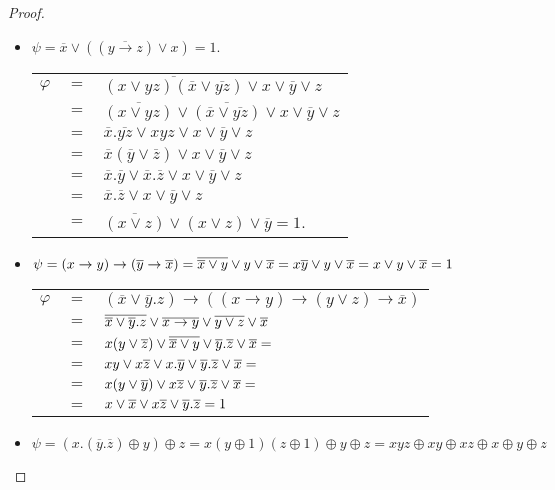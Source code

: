 \begin{proof}
  \begin{itemize}
  \item
    $\psi = \overline{x}\vee ((\overline{y\rightarrow z})\vee x) = 1$.
    
    \begin{tabular}{l c l}
      $\varphi $ & $ =$ & $ \overline{(x\vee yz)(\overline{x}\vee\overline{yz})} \vee x\vee \overline{y}\vee z$\\
      & $=$ & $\overline{(x\vee yz)}\vee\overline{(\overline{x}\vee\overline{yz})} \vee x\vee \overline{y}\vee z$\\
      & $=$ & $\overline{x}.\overline{yz} \vee xyz \vee x\vee \overline{y}\vee z$\\
      & $=$ & $\overline{x}(\overline{y}\vee\overline{z}) \vee x\vee \overline{y}\vee z$\\
      & $=$ & $\overline{x}.\overline{y} \vee \overline{x}.\overline{z} \vee x\vee \overline{y}\vee z$\\
      & $=$ & $\overline{x}.\overline{z} \vee x\vee \overline{y}\vee z$\\
      & $=$ & $\overline{(x\vee z)} \vee (x\vee z)\vee \overline{y} = 1$.
    \end{tabular}
  \item
    $\psi = (x\rightarrow y)\rightarrow(\overline{y}\rightarrow\overline{x}) = 
    \overline{\overline{x}\vee y} \vee y \vee \overline{x} = x\overline{y} \vee y \vee \overline{x} = x \vee y \vee \overline{x} = 1$
    
    \begin{tabular}{l c l}
      $\varphi $ & $=$ & $(\overline{x}\vee \overline{y}.z)\rightarrow ((x\rightarrow y)\rightarrow (y\vee z)\rightarrow\overline{x}) $\\
      & $ = $ & $\overline{\overline{x}\vee \overline{y}.z} \vee \overline{x\rightarrow y} \vee \overline{y\vee z} \vee \overline{x}$ \\
      & $=$ & $x(y\vee \overline{z})\vee \overline{\overline{x}\vee y} \vee \overline{y}.\overline{z} \vee \overline{x} = $\\
      & $=$ & $xy \vee x\overline{z} \vee x.\overline{y} \vee \overline{y}.\overline{z} \vee \overline{x} =$ \\
      & $=$ & $x(y\vee\overline{y}) \vee x\overline{z} \vee \overline{y}.\overline{z} \vee \overline{x} = $\\
      & $=$ & $x \vee \overline{x} \vee x\overline{z} \vee \overline{y}.\overline{z} = 1$
    \end{tabular}
    
  \item
    $\psi = (x.(\overline{y}.\overline{z})\oplus y)\oplus z = x(y\oplus 1)(z\oplus 1) \oplus y \oplus z = xyz \oplus xy \oplus xz \oplus x \oplus y \oplus z$
    

\end{itemize}
\end{proof}
